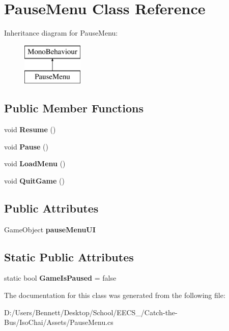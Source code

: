 \hypertarget{class_pause_menu}{}\section{Pause\+Menu Class Reference}
\label{class_pause_menu}
Inheritance diagram for Pause\+Menu\+:\begin{figure}[H]
\begin{center}
\leavevmode
\includegraphics[height=2.000000cm]{class_pause_menu}
\end{center}
\end{figure}
\subsection*{Public Member Functions}
\begin{DoxyCompactItemize}
\item 
\mbox{\label{class_pause_menu_a4416b25e65dfadf57cd8657eaf94f7df}} 
void {\bfseries Resume} ()
\item 
\mbox{\label{class_pause_menu_a712dac1268693262de144337e2835ea7}} 
void {\bfseries Pause} ()
\item 
\mbox{\label{class_pause_menu_ae4e1559b2fa04a8bb22fc2f8650433c8}} 
void {\bfseries Load\+Menu} ()
\item 
\mbox{\label{class_pause_menu_a833077a2752465d59d0e7e5ad756b7ab}} 
void {\bfseries Quit\+Game} ()
\end{DoxyCompactItemize}
\subsection*{Public Attributes}
\begin{DoxyCompactItemize}
\item 
\mbox{\label{class_pause_menu_a49305f37ccebc2342ea009f5cb259fee}} 
Game\+Object {\bfseries pause\+Menu\+UI}
\end{DoxyCompactItemize}
\subsection*{Static Public Attributes}
\begin{DoxyCompactItemize}
\item 
\mbox{\label{class_pause_menu_a4ca5f2ef5197fa89f9ecb4d6d4f47560}} 
static bool {\bfseries Game\+Is\+Paused} = false
\end{DoxyCompactItemize}


The documentation for this class was generated from the following file\+:\begin{DoxyCompactItemize}
\item 
D\+:/\+Users/\+Bennett/\+Desktop/\+School/\+E\+E\+C\+S\+\_/\+Catch-\/the-\/\+Bus/\+Iso\+Chai/\+Assets/Pause\+Menu.\+cs\end{DoxyCompactItemize}
